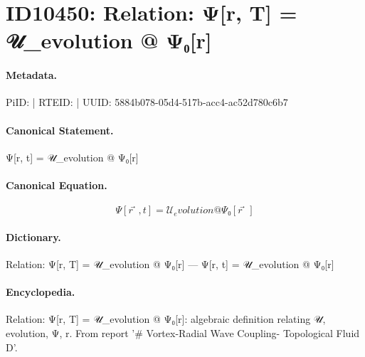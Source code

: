 \section*{ID10450: Relation: Ψ[r⃗, T] = 𝒰\_evolution @ Ψ₀[r⃗]}
\paragraph{Metadata.}
PiID:  | RTEID:  | UUID: 5884b078-05d4-517b-acc4-ac52d780c6b7

\paragraph{Canonical Statement.}
Ψ[r⃗, t] = 𝒰\_evolution @ Ψ₀[r⃗]

\paragraph{Canonical Equation.}
\[
Ψ[r⃗, t] = 𝒰_evolution @ Ψ₀[r⃗]
\]

\paragraph{Dictionary.}
Relation: Ψ[r⃗, T] = 𝒰\_evolution @ Ψ₀[r⃗] — Ψ[r⃗, t] = 𝒰\_evolution @ Ψ₀[r⃗]

\paragraph{Encyclopedia.}
Relation: Ψ[r⃗, T] = 𝒰\_evolution @ Ψ₀[r⃗]: algebraic definition relating 𝒰, evolution, Ψ, r. From report '\# Vortex-Radial Wave Coupling- Topological Fluid D'.
